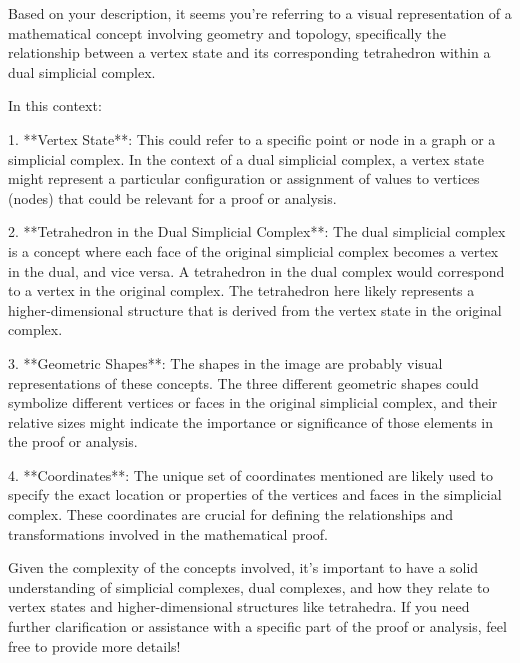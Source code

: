 Based on your description, it seems you're referring to a visual representation of a mathematical concept involving geometry and topology, specifically the relationship between a vertex state and its corresponding tetrahedron within a dual simplicial complex.

In this context:

1. **Vertex State**: This could refer to a specific point or node in a graph or a simplicial complex. In the context of a dual simplicial complex, a vertex state might represent a particular configuration or assignment of values to vertices (nodes) that could be relevant for a proof or analysis.

2. **Tetrahedron in the Dual Simplicial Complex**: The dual simplicial complex is a concept where each face of the original simplicial complex becomes a vertex in the dual, and vice versa. A tetrahedron in the dual complex would correspond to a vertex in the original complex. The tetrahedron here likely represents a higher-dimensional structure that is derived from the vertex state in the original complex.

3. **Geometric Shapes**: The shapes in the image are probably visual representations of these concepts. The three different geometric shapes could symbolize different vertices or faces in the original simplicial complex, and their relative sizes might indicate the importance or significance of those elements in the proof or analysis.

4. **Coordinates**: The unique set of coordinates mentioned are likely used to specify the exact location or properties of the vertices and faces in the simplicial complex. These coordinates are crucial for defining the relationships and transformations involved in the mathematical proof.

Given the complexity of the concepts involved, it's important to have a solid understanding of simplicial complexes, dual complexes, and how they relate to vertex states and higher-dimensional structures like tetrahedra. If you need further clarification or assistance with a specific part of the proof or analysis, feel free to provide more details!